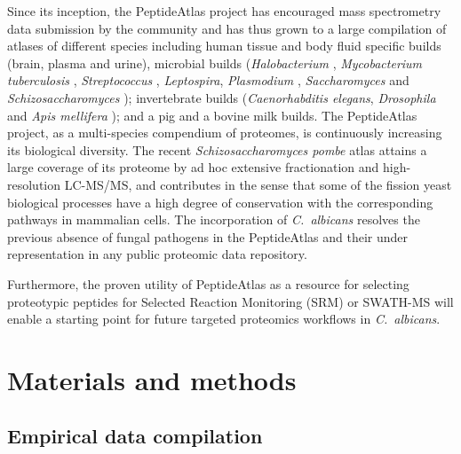 Since its inception, the PeptideAtlas project \citep{Desiere2006} has 
encouraged mass spectrometry data submission by the community and
has thus grown to a large compilation of atlases of different
species including human tissue and body fluid specific builds
(brain, plasma \citep{Farrah2011} and urine), microbial builds (\textit{Halobacterium} \citep{Van2008a},
\textit{Mycobacterium tuberculosis} \citep{Schubert2013}, \textit{Streptococcus} \citep{Lange2008},
\textit{Leptospira}, \textit{Plasmodium} \citep{Lindner2013}, \textit{Saccharomyces} \citep{King2006}
and \textit{Schizosaccharomyces} \citep{Gunaratne2013b});
invertebrate builds (\textit{Caenorhabditis elegans}, \textit{Drosophila} \citep{Loevenich2009} and
\textit{Apis mellifera} \citep{Chan2011}); and a pig and a bovine milk \citep{Bislev2012} builds. The
PeptideAtlas project, as a multi-species compendium of
proteomes, is continuously increasing its biological diversity.
The recent  \textit{Schizosaccharomyces pombe} atlas \citep{Gunaratne2013b} attains a large
coverage of its proteome by ad hoc extensive fractionation and
high-resolution LC-MS/MS, and contributes in the sense that
some of the fission yeast biological processes have a high degree
of conservation with the corresponding pathways in mammalian
cells. The incorporation of \textit{\mbox{C. albicans}} resolves the previous
absence of fungal pathogens in the PeptideAtlas and their under
representation in any public proteomic data repository.

Furthermore, the proven utility of PeptideAtlas as a resource
for selecting proteotypic peptides for Selected Reaction Monitoring (SRM)
 \citep{Deutsch2008} or SWATH-MS \citep{Gillet2012} will enable a starting point
for future targeted proteomics workflows in \textit{\mbox{C. albicans}}.



\section*{Materials and methods}

\subsection*{Empirical data compilation}

